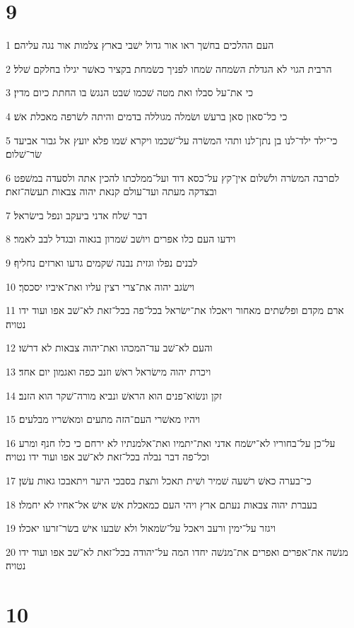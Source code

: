 \chapter{9}

\par 1 העם ההלכים בחשׁך ראו אור גדול ישׁבי בארץ צלמות אור נגה עליהם׃
\par 2 הרבית הגוי לא הגדלת השׂמחה שׂמחו לפניך כשׂמחת בקציר כאשׁר יגילו בחלקם שׁלל׃
\par 3 כי את־על סבלו ואת מטה שׁכמו שׁבט הנגשׂ בו החתת כיום מדין׃
\par 4 כי כל־סאון סאן ברעשׁ ושׂמלה מגוללה בדמים והיתה לשׂרפה מאכלת אשׁ׃
\par 5 כי־ילד ילד־לנו בן נתן־לנו ותהי המשׂרה על־שׁכמו ויקרא שׁמו פלא יועץ אל גבור אביעד שׂר־שׁלום׃
\par 6 לםרבה המשׂרה ולשׁלום אין־קץ על־כסא דוד ועל־ממלכתו להכין אתה ולסעדה במשׁפט ובצדקה מעתה ועד־עולם קנאת יהוה צבאות תעשׂה־זאת׃
\par 7 דבר שׁלח אדני ביעקב ונפל בישׂראל׃
\par 8 וידעו העם כלו אפרים ויושׁב שׁמרון בגאוה ובגדל לבב לאמר׃
\par 9 לבנים נפלו וגזית נבנה שׁקמים גדעו וארזים נחליף׃
\par 10 וישׂגב יהוה את־צרי רצין עליו ואת־איביו יסכסך׃
\par 11 ארם מקדם ופלשׁתים מאחור ויאכלו את־ישׂראל בכל־פה בכל־זאת לא־שׁב אפו ועוד ידו נטויה׃
\par 12 והעם לא־שׁב עד־המכהו ואת־יהוה צבאות לא דרשׁו׃
\par 13 ויכרת יהוה מישׂראל ראשׁ וזנב כפה ואגמון יום אחד׃
\par 14 זקן ונשׂוא־פנים הוא הראשׁ ונביא מורה־שׁקר הוא הזנב׃
\par 15 ויהיו מאשׁרי העם־הזה מתעים ומאשׁריו מבלעים׃
\par 16 על־כן על־בחוריו לא־ישׂמח אדני ואת־יתמיו ואת־אלמנתיו לא ירחם כי כלו חנף ומרע וכל־פה דבר נבלה בכל־זאת לא־שׁב אפו ועוד ידו נטויה׃
\par 17 כי־בערה כאשׁ רשׁעה שׁמיר ושׁית תאכל ותצת בסבכי היער ויתאבכו גאות עשׁן׃
\par 18 בעברת יהוה צבאות נעתם ארץ ויהי העם כמאכלת אשׁ אישׁ אל־אחיו לא יחמלו׃
\par 19 ויגזר על־ימין ורעב ויאכל על־שׂמאול ולא שׂבעו אישׁ בשׂר־זרעו יאכלו׃
\par 20 מנשׁה את־אפרים ואפרים את־מנשׁה יחדו המה על־יהודה בכל־זאת לא־שׁב אפו ועוד ידו נטויה׃

\chapter{10}

